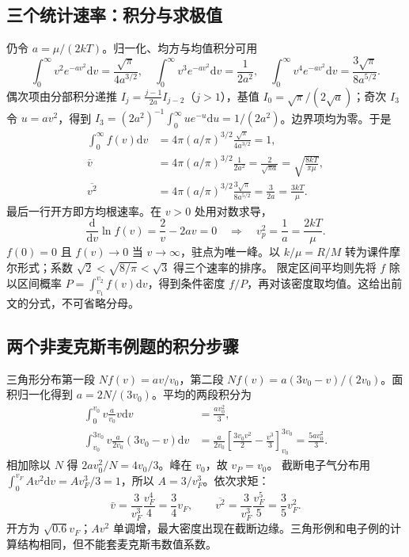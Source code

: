 \documentclass[UTF8,fontset=none,zihao=-4,a4paper]{ctexart}
\begin{document}
\subsection{三个统计速率：积分与求极值}
仍令 $a=\mu/(2kT)$。归一化、均方与均值积分可用
\[
\int_0^\infty v^2e^{-av^2}\mathrm dv=\frac{\sqrt\pi}{4a^{3/2}},\quad
\int_0^\infty v^3e^{-av^2}\mathrm dv=\frac1{2a^2},\quad
\int_0^\infty v^4e^{-av^2}\mathrm dv=\frac{3\sqrt\pi}{8a^{5/2}}.
\]
偶次项由分部积分递推 $I_j=\frac{j-1}{2a}I_{j-2}$（$j>1$），基值 $I_0=\sqrt\pi/(2\sqrt a)$；奇次 $I_3$ 令 $u=av^2$，得到 $I_3=(2a^2)^{-1}\int_0^\infty ue^{-u}\mathrm du=1/(2a^2)$。边界项均为零。于是
\begin{align*}
\int_0^\infty f(v)\mathrm dv&=4\pi(a/\pi)^{3/2}\frac{\sqrt\pi}{4a^{3/2}}=1,\\
\bar v&=4\pi(a/\pi)^{3/2}\frac1{2a^2}=\frac2{\sqrt{\pi a}}=\sqrt{\frac{8kT}{\pi\mu}},\\
\overline{v^2}&=4\pi(a/\pi)^{3/2}\frac{3\sqrt\pi}{8a^{5/2}}=\frac3{2a}=\frac{3kT}{\mu}.
\end{align*}
最后一行开方即方均根速率。在 $v>0$ 处用对数求导，
\[
\frac{\mathrm d}{\mathrm dv}\ln f(v)=\frac2v-2av=0
\quad\Longrightarrow\quad v_p^2=\frac1a=\frac{2kT}\mu.
\]
$f(0)=0$ 且 $f(v)\to0$ 当 $v\to\infty$，驻点为唯一峰。以 $k/\mu=R/M$ 转为课件摩尔形式；系数 $\sqrt2<\sqrt{8/\pi}<\sqrt3$ 得三个速率的排序。
限定区间平均则先将 $f$ 除以区间概率 $P=\int_{v_1}^{v_2}f(v)\mathrm dv$，得到条件密度 $f/P$，再对该密度取均值。这给出前文的分式，不可省略分母。

\subsection{两个非麦克斯韦例题的积分步骤}
三角形分布第一段 $Nf(v)=av/v_0$，第二段 $Nf(v)=a(3v_0-v)/(2v_0)$。面积归一化得到 $a=2N/(3v_0)$。平均的两段积分为
\begin{align*}
\int_0^{v_0}v\frac a{v_0}v\mathrm dv&=\frac{av_0^2}{3},\\
\int_{v_0}^{3v_0}v\frac a{2v_0}(3v_0-v)\mathrm dv&=\frac a{2v_0}\left[\frac{3v_0v^2}{2}-\frac{v^3}{3}\right]_{v_0}^{3v_0}=\frac{5av_0^2}{3}.
\end{align*}
相加除以 $N$ 得 $2av_0^2/N=4v_0/3$。峰在 $v_0$，故 $v_P=v_0$。
截断电子气分布用 $\int_0^{v_F}Av^2\mathrm dv=Av_F^3/3=1$，所以 $A=3/v_F^3$。依次求矩：
\[
\bar v=\frac3{v_F^3}\frac{v_F^4}4=\frac34v_F,\qquad
\overline{v^2}=\frac3{v_F^3}\frac{v_F^5}5=\frac35v_F^2.
\]
开方为 $\sqrt{0.6}v_F$；$Av^2$ 单调增，最大密度出现在截断边缘。三角形例和电子例的计算结构相同，但不能套麦克斯韦数值系数。
\end{document}
